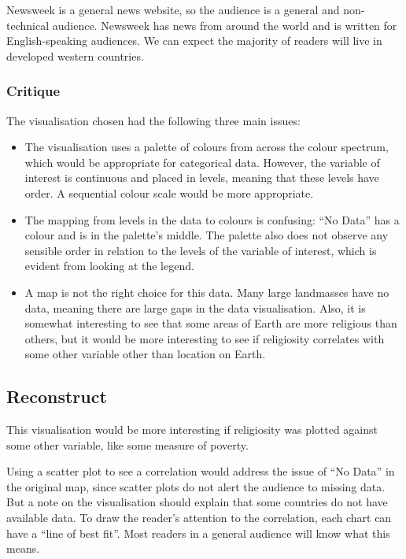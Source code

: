 \documentclass[
]{article}
\providecommand{\tightlist}{%
  \setlength{\itemsep}{0pt}\setlength{\parskip}{0pt}}
\begin{document}
Newsweek is a general news website, so the audience is a general and
non-technical audience. Newsweek has news from around the world and is
written for English-speaking audiences. We can expect the majority of
readers will live in developed western countries.

\subsubsection{Critique}\label{critique}

The visualisation chosen had the following three main issues:

\begin{itemize}
\tightlist
\item
  The visualisation uses a palette of colours from across the colour
  spectrum, which would be appropriate for categorical data. However,
  the variable of interest is continuous and placed in levels, meaning
  that these levels have order. A sequential colour scale would be more
  appropriate.
\item
  The mapping from levels in the data to colours is confusing: ``No
  Data'' has a colour and is in the palette's middle. The palette also
  does not observe any sensible order in relation to the levels of the
  variable of interest, which is evident from looking at the legend.
\item
  A map is not the right choice for this data. Many large landmasses
  have no data, meaning there are large gaps in the data visualisation.
  Also, it is somewhat interesting to see that some areas of Earth are
  more religious than others, but it would be more interesting to see if
  religiosity correlates with some other variable other than location on
  Earth.
\end{itemize}

\subsection{Reconstruct}\label{reconstruct}

This visualisation would be more interesting if religiosity was plotted
against some other variable, like some measure of poverty.

Using a scatter plot to see a correlation would address the issue of
``No Data'' in the original map, since scatter plots do not alert the
audience to missing data. But a note on the visualisation should explain
that some countries do not have available data. To draw the reader's
attention to the correlation, each chart can have a ``line of best
fit''. Most readers in a general audience will know what this means.
\end{document}
